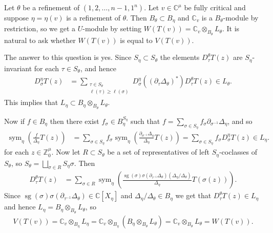 \documentclass[11pt,fleqn]{article}
\newcommand\CC{\mathbb C}
\newcommand\ZZ{\mathbb Z}
\newcommand\ot{\otimes}
\DeclareMathOperator\sym{sym}
\DeclareMathOperator\sg{sg}
\begin{document}
\begin{Remark}
Let $\theta$ be a refinement of $(1,2, \ldots, n-1, 1^n)$.
Let $v \in \CC^\mu$ be fully critical and suppose $\eta = \eta(v)$ is
a refinement of $\theta$. Then $B_\theta \subset B_\eta$ and $\CC_v$ is a 
$B_\theta$-module by restriction, so we get a $U$-module by setting $W(T(v))
= \CC_v \ot_{B_\theta} L_\theta$. It is natural to ask whether $W(T(v))$ is 
equal to $V(T(v))$. 

The answer to this question is yes. Since $S_\eta \subset S_\theta$ the 
elements $D^\theta_\tau T(z)$ are $S_\eta$-invariant for each $\tau \in 
S_\theta$, and hence
\begin{align*}
D_\sigma^\eta T(z)
  &= \sum_{\substack{\tau \in S_\theta\\ \ell(\tau) \geq \ell(\sigma)}}
    D_\sigma^\eta ((\partial_\tau \Delta_\theta)^*) D_\tau^\theta T(z)
    \in L_\theta.
\end{align*} 
This implies that $L_\eta \subset B_\eta \ot_{B_\theta} L_\theta$.

Now if $f \in B_\eta$ then there exist $f_\sigma \in B_\eta^{S_\eta}$
such that $f = \sum_{\sigma \in S_\eta} f_\sigma \partial_{\sigma^{-1}}
\Delta_\eta$, and so
\begin{align*}
\sym_\eta \left( \frac{f}{\Delta_\eta} T(z)\right)
  &= \sum_{\sigma \in S_\eta} f_\sigma \sym_\eta \left( 
    \frac{\partial_{\sigma^{-1}} \Delta_\eta}{\Delta_\eta} T(z)
  \right)
  = \sum_{\sigma \in S_\eta} f_\sigma D_\sigma^\eta T(z) \in L_\eta.  
\end{align*}
for each $z \in \ZZ^\mu_0$. Now let $R \subset S_\theta$ be a set of 
representatives of left $S_\eta$-coclasses of $S_\theta$, so $S_\theta
= \bigsqcup_{\sigma \in R} S_\eta \sigma$. Then
\begin{align*}
D_\tau^\theta T(z)
  &= \sum_{\sigma \in R} \sym_\eta \left(
    \frac{\sg(\sigma) \sigma(\partial_{\tau^{-1}} \Delta_\theta)
      (\Delta_\eta/\Delta_\theta)}
    {\Delta_\eta} T(\sigma(z))
  \right).
\end{align*}
Since $\sg(\sigma) \sigma(\partial_{\tau^{-1}} \Delta_\theta) \in \CC[X_\eta]$ 
and $\Delta_\eta/\Delta_\theta \in B_\eta$ we get that $D_\tau^\theta T(z) \in 
L_\eta$ and hence $L_\eta = B_\eta \ot_{B_\theta} L_\theta$, so
\begin{align*}
V(T(v)) 
  = \CC_v \ot_{B_\eta} L_\eta 
  = \CC_v \ot_{B_\eta} (B_\eta \ot_{B_\theta} L_\theta)
  = \CC_v \ot_{B_\theta} L_\theta
  = W(T(v)).
\end{align*}
\end{Remark}
\end{document}
